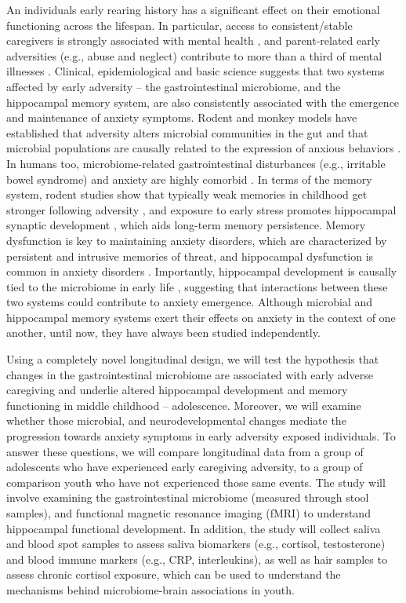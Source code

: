 \documentclass[]{book}
\begin{document}
An individuals early rearing history has a significant effect on their emotional functioning across the lifespan. In particular, access to consistent/stable caregivers is strongly associated with mental health \citep{repetti_2002}, and parent-related early adversities (e.g., abuse and neglect) contribute to more than a third of mental illnesses \citep[anxiety being the most common diagnosis;][]{kessler_2005}. Clinical, epidemiological and basic science suggests that two systems affected by early adversity -- the gastrointestinal microbiome, and the hippocampal memory system, are also consistently associated with the emergence and maintenance of anxiety symptoms. Rodent and monkey models have established that adversity alters microbial communities in the gut \citep{bailey_1999, bailey_2010, omahony_2009} and that microbial populations are causally related to the expression of anxious behaviors \citep{collins_2013}. In humans too, microbiome-related gastrointestinal disturbances (e.g., irritable bowel syndrome) and anxiety are highly comorbid \citep{kennedy_2014, callaghan_2019}. In terms of the memory system, rodent studies show that typically weak memories in childhood get stronger following adversity \citetext{\citealp{callaghan_2012a}; \citealp[callaghan\_2012b;][]{cowan_2013}}, and exposure to early stress promotes hippocampal synaptic development \citep{huang_2005}, which aids long-term memory persistence. Memory dysfunction is key to maintaining anxiety disorders, which are characterized by persistent and intrusive memories of threat\citep{acheson_2012, zlomuzica_2014}, and hippocampal dysfunction is common in anxiety disorders \citep{godsil_2013}. Importantly, hippocampal development is causally tied to the microbiome in early life \citep{callaghan_2016, clarke_2013, cowan_2016, gareau_2011}, suggesting that interactions between these two systems could contribute to anxiety emergence. Although microbial and hippocampal memory systems exert their effects on anxiety in the context of one another, until now, they have always been studied independently.

Using a completely novel longitudinal design, we will test the hypothesis that changes in the gastrointestinal microbiome are associated with early adverse caregiving and underlie altered hippocampal development and memory functioning in middle childhood -- adolescence. Moreover, we will examine whether those microbial, and neurodevelopmental changes mediate the progression towards anxiety symptoms in early adversity exposed individuals. To answer these questions, we will compare longitudinal data from a group of adolescents who have experienced early caregiving adversity, to a group of comparison youth who have not experienced those same events. The study will involve examining the gastrointestinal microbiome (measured through stool samples), and functional magnetic resonance imaging (fMRI) to understand hippocampal functional development. In addition, the study will collect saliva and blood spot samples to assess saliva biomarkers (e.g., cortisol, testosterone) and blood immune markers (e.g., CRP, interleukins), as well as hair samples to assess chronic cortisol exposure, which can be used to understand the mechanisms behind microbiome-brain associations in youth.
\end{document}
